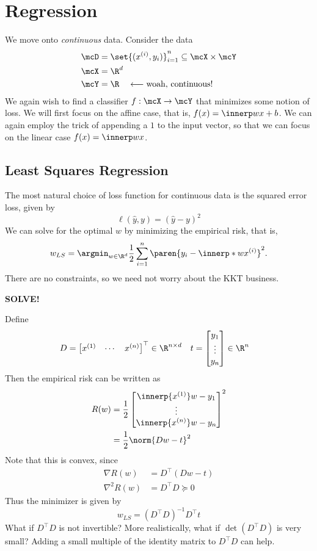 \chapter{Regression} \label{chp:regression}
We move onto \emph{continuous} data.
Consider the data \begin{align*}
    \mcD &= \set{(x^{(i)}, y_i)}_{i=1}^n \subseteq \mcX \times \mcY \\
    \mcX &= \R^d \\
    \mcY &= \R \quad\longleftarrow \text{woah, continuous!}
\end{align*}
We again wish to find a classifier $f: \mcX \to \mcY$ that minimizes some
notion of loss.
We will first focus on the affine case, that is, $f(x) = \innerp w x + b$.
We can again employ the trick of appending a $1$ to the input vector,
so that we can focus on the linear case $f(x) = \innerp w x$.

\section{Least Squares Regression} \label{sec:regression:least_squares}
The most natural choice of loss function for continuous data is the squared
error loss, given by \[
    \ell(\hat{y}, y) = (\hat{y} - y)^2
\]
We can solve for the optimal $w$ by minimizing the empirical risk, that is,
\[
    w_{LS} = \argmin_{w \in \R^d}
            \frac12 \sum_{i=1}^n \paren{y_i - \innerp* w {x^{(i)}}}^2.
\] There are no constraints, so we need not worry about the KKT business.

\textbf{SOLVE!}

Define \begin{align*}
    D &= \begin{bmatrix}
        x^{(1)} & \cdots & x^{(n)}
    \end{bmatrix}^\top \in \R^{n \times d}
    & t &= \begin{bmatrix}
        y_1 \\ \vdots \\ y_n
    \end{bmatrix} \in \R^n
\end{align*}
Then the empirical risk can be written as \begin{align*}
    R(w) &= \frac12 \begin{bmatrix}
        \innerp{x^{(1)}} w - y_1 \\
        \vdots \\
        \innerp{x^{(n)}} w - y_n
    \end{bmatrix}^2 \\
    &= \frac12 \norm{Dw - t}^2
\end{align*}
Note that this is convex, since \begin{align*}
    \nabla R(w) &= D^\top (Dw - t) \\
    \nabla^2 R(w) &= D^\top D \succeq 0
\end{align*}
Thus the minimizer is given by \[
    \boxed{w_{LS} = (D^\top D)^{-1} D^\top t}
\]
What if $D^\top D$ is not invertible?
More realistically, what if $\det (D^\top D)$ is very small?
Adding a small multiple of the identity matrix to $D^\top D$ can help.

